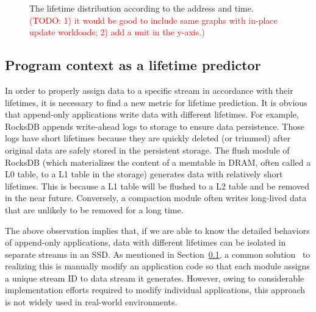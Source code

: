 \begin{figure}[t]
	\centering
	\vspace{-10pt}
	\caption{
		The lifetime distribution according to the address and time.
		\textcolor{red}{(TODO: 1) it would be good to include same graphs with
		in-place update workloads; 2) add a unit in the y-axis.)}}
		\label{fig:lba_lifetime}
	\vspace{-15pt}
\end{figure}

\subsection{Program context as a lifetime predictor}

In order to properly assign data to a specific stream in accordance with their
lifetimes, it is necessary to find a new metric for lifetime prediction.  It is
obvious that append-only applications write data with different lifetimes.  For
example, RocksDB appends write-ahead logs to storage to ensure data
persistence.  Those logs have short lifetimes because they are quickly deleted
(or trimmed) after original data are safely stored in the persistent storage.
The flush module of RocksDB (which materializes the content of a memtable in
DRAM, often called a L0 table, to a L1 table in the storage) generates data
with relatively short lifetimes. This is because a L1 table will be flushed to
a L2 table and be removed in the near future. Conversely, a compaction module
often writes long-lived data that are unlikely to be removed for a long time.

The above observation implies that, if we are able to know the detailed
behaviors of append-only applications, data with different lifetimes can be
isolated in separate streams in an SSD. As mentioned in Section~\ref{}, a
common solution~\cite{MultiStream} to realizing this is manually modify an
application code so that each module assigns a unique stream ID to data stream
it generates. However, owing to considerable implementation efforts
required to modify individual applications, this approach is not widely used in
real-world environments.

